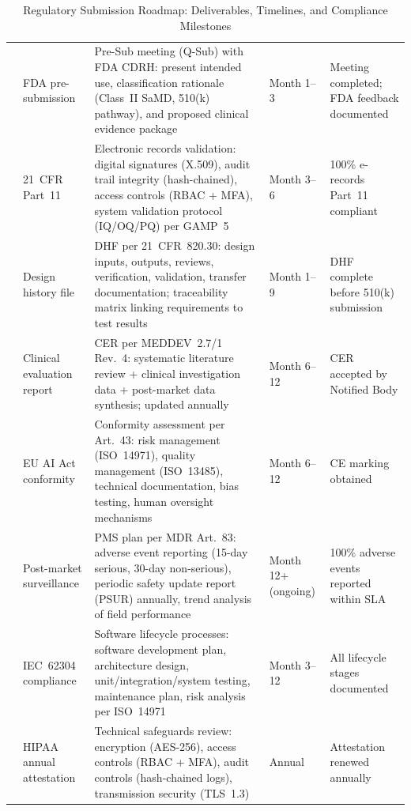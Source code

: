{\tablestripes\tablefontsize
{}
\begin{xltabular}{\textwidth}{@{} p{1.0cm} p{2.3cm} p{6.2cm} p{2.0cm} p{2.8cm} @{}}
\caption[Regulatory Submission Roadmap]{Regulatory Submission Roadmap: Deliverables, Timelines, and Compliance Milestones}\label{tab:regulatory_roadmap} \\
\toprule
\thead{\#} &  &  &  &  \\
\midrule
\endfirsthead
\endhead
\bottomrule
{} & FDA pre-submission & Pre-Sub meeting (Q-Sub) with FDA CDRH: present intended use, classification rationale (Class~II SaMD, 510(k) pathway), and proposed clinical evidence package & Month 1--3 & Meeting completed; FDA feedback documented \\
 & 21~CFR Part~11 & Electronic records validation: digital signatures (X.509), audit trail integrity (hash-chained), access controls (RBAC + MFA), system validation protocol (IQ/OQ/PQ) per GAMP~5 & Month 3--6 & 100\% e-records Part~11 compliant \\
 & Design history file & DHF per 21~CFR~820.30: design inputs, outputs, reviews, verification, validation, transfer documentation; traceability matrix linking requirements to test results & Month 1--9 & DHF complete before 510(k) submission \\
 & Clinical evaluation report & CER per MEDDEV~2.7/1 Rev.~4: systematic literature review + clinical investigation data + post-market data synthesis; updated annually & Month 6--12 & CER accepted by Notified Body \\
 & EU AI Act conformity & Conformity assessment per Art.~43: risk management (ISO~14971), quality management (ISO~13485), technical documentation, bias testing, human oversight mechanisms & Month 6--12 & CE marking obtained \\
 & Post-market surveillance & PMS plan per MDR Art.~83: adverse event reporting (15-day serious, 30-day non-serious), periodic safety update report (PSUR) annually, trend analysis of field performance & Month 12+ (ongoing) & 100\% adverse events reported within SLA \\
 & IEC~62304 compliance & Software lifecycle processes: software development plan, architecture design, unit/integration/system testing, maintenance plan, risk analysis per ISO~14971 & Month 3--12 & All lifecycle stages documented \\
 & HIPAA annual attestation & Technical safeguards review: encryption (AES-256), access controls (RBAC + MFA), audit controls (hash-chained logs), transmission security (TLS~1.3) & Annual & Attestation renewed annually \\
\end{xltabular}}
